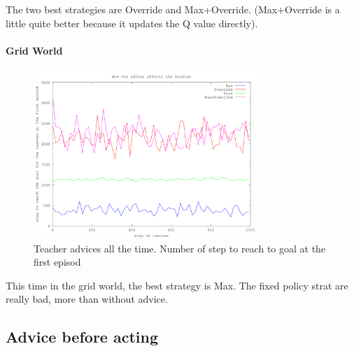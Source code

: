 \documentclass[a4paper,12pt]{article}
\begin{document}
      The two best strategies are Override and Max+Override. (Max+Override is a little quite better because it
      updates the Q value directly).
      
      \paragraph{Grid World}
      \begin{figure}[H]
      \begin{center}
	\includegraphics[width=320px]{graphA_GA}
	\caption{ Teacher advices all the time. Number of step to reach to goal at the first episod }
	\end{center}
      \end{figure}
      
      This time in the grid world, the best strategy is Max.
      The fixed policy strat are really bad, more than without advice.
      
%       
%       
      
      \subsection{Advice before acting}
      
\end{document}
